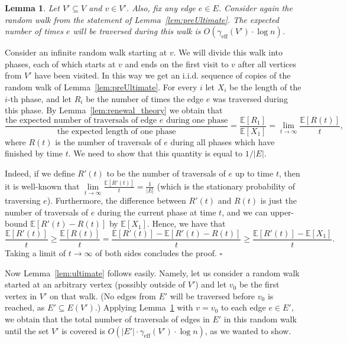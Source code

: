 \documentclass[11pt, letterpaper]{article}
\newtheorem{lemma}[theorem]{Lemma}
\newenvironment{proof}{\noindent{\bf Proof:}\hspace*{1em}}{\qed\bigskip}
\newcommand{\qed}{\hfill\ensuremath{\square}}
\newcommand{\diameff}{\gamma_{\mathrm{eff}}}
\newcommand{\bE}{\mathbb{E}}
\begin{document}
\begin{lemma} \label{lem:ultimate_for_one_edge}
Let $V' \subseteq V$ and $v \in V'$. Also, fix any edge $e \in E$. Consider again the random walk from the statement of Lemma~\ref{lem:preUltimate}. The expected number of times  $e$ will be traversed during this walk is $O(\diameff(V') \cdot \log n)$.
\end{lemma}
\begin{proof}
Consider an infinite random walk starting at $v$. We will divide this walk into phases, each of which starts at $v$ and ends on the first visit to $v$ after all vertices from $V'$ have been visited. In this way we get an i.i.d. sequence of copies of the random walk of Lemma~\ref{lem:preUltimate}. For every $i$ let $X_i$ be the length of the $i$-th phase, and let $R_i$ be the number of times the edge $e$ was traversed during this phase. By Lemma~\ref{lem:renewal_theory} we obtain that
\[
\frac{\mbox{the expected number of traversals of edge $e$ during one phase}}{\mbox{the expected length of one phase}}
=
\frac{\bE[R_1]}{\bE[X_1]} = \lim_{t \to \infty} \frac{\bE[R(t)]}{t}, \]
where $R(t)$ is the number of traversals of $e$ during all phases which have finished by time $t$. We need to show that this quantity is equal to $1/|E|$.

Indeed, if we define $R'(t)$ to be the number of traversals of $e$ up to time $t$, then it is well-known
that $\lim\limits_{t \to \infty} \frac{\bE[R'(t)]}{t} = \frac{1}{|E|}$ (which is the stationary probability of traversing $e$). Furthermore, the difference between $R'(t)$ and $R(t)$ is just the number of traversals of $e$ during the current phase at time $t$, and we can upper-bound $\bE[R'(t) - R(t)]$ by $\bE[X_1]$. Hence, we have that
\[
\frac{\bE[R'(t)]}{t} \ge \frac{\bE[R(t)]}{t} = \frac{\bE[R'(t)] - \bE[R'(t) - R(t)]}{t} \ge \frac{\bE[R'(t)] - \bE[X_1]}{t}.
\]
Taking a limit of $t\rightarrow \infty$ of both sides concludes the proof.
\end{proof}

Now Lemma~\ref{lem:ultimate} follows easily. Namely, let us consider a random walk started at an arbitrary vertex (possibly outside of $V'$) and let $v_0$ be the first vertex in $V'$ on that walk. (No edges from $E'$ will be traversed before $v_0$ is reached, as $E' \subseteq E(V')$.) Applying Lemma~\ref{lem:ultimate_for_one_edge} with $v=v_0$ to each edge $e \in E'$, we obtain that the total number of traversals of edges in $E'$ in this random walk until the set $V'$ is covered is $O(|E'|\cdot \diameff(V') \cdot \log n)$, as we wanted to show. 
\end{document}
